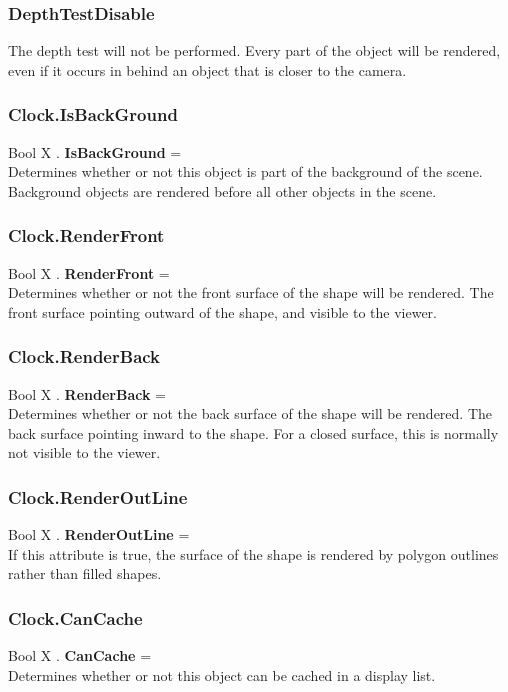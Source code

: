 \documentclass[10pt]{book}
\begin{document}
\subsubsection{DepthTestDisable \label{T:DepthTest|DepthTestDisable}}
The depth test will not be performed. Every part of the object will be rendered, even if it occurs in behind an object that is closer to the camera.

\subsubsection{Clock.IsBackGround \label{F:Clock:IsBackGround}}
Bool X . \textbf{IsBackGround} = \\
Determines whether or not this object is part of the background of the scene. Background objects are rendered before all other objects in the scene.

\subsubsection{Clock.RenderFront \label{F:Clock:RenderFront}}
Bool X . \textbf{RenderFront} = \\
Determines whether or not the front surface of the shape will be rendered. The front surface pointing outward of the shape, and visible to the viewer.

\subsubsection{Clock.RenderBack \label{F:Clock:RenderBack}}
Bool X . \textbf{RenderBack} = \\
Determines whether or not the back surface of the shape will be rendered. The back surface pointing inward to the shape. For a closed surface, this is normally not visible to the viewer.

\subsubsection{Clock.RenderOutLine \label{F:Clock:RenderOutLine}}
Bool X . \textbf{RenderOutLine} = \\
If this attribute is true, the surface of the shape is rendered by polygon outlines rather than filled shapes.

\subsubsection{Clock.CanCache \label{F:Clock:CanCache}}
Bool X . \textbf{CanCache} = \\
Determines whether or not this object can be cached in a display list.
\end{document}
